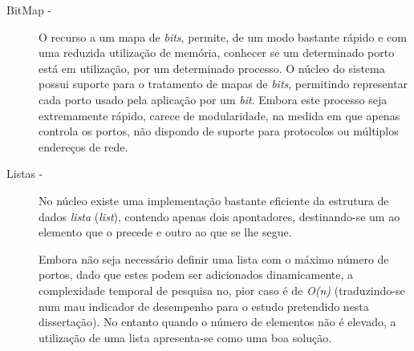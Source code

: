 \begin{description}

\item[BitMap - ]

O recurso a um mapa de \textit{bits}, permite, de um modo bastante rápido e com uma reduzida utilização de memória, conhecer se um determinado porto está em utilização, por um determinado processo.
O núcleo do sistema possui suporte para o tratamento de mapas de \textit{bits}, permitindo representar cada porto usado pela aplicação por um \textit{bit}.
Embora este processo seja extremamente rápido, carece de modularidade, na medida em que apenas controla os portos, não dispondo de suporte para protocolos ou múltiplos endereços de rede.

 



\item[Listas - ]

No núcleo existe uma implementação bastante eficiente da estrutura de dados \emph{lista} (\emph{list}), contendo apenas dois apontadores, destinando-se um ao elemento que o precede e outro ao que se lhe segue.

Embora não seja necessário definir uma lista com o máximo número de portos, dado que estes podem ser adicionados dinamicamente, a complexidade temporal de pesquisa no, pior caso é de \textit{O(n)} (traduzindo-se num mau indicador de desempenho para o estudo pretendido nesta dissertação).
No entanto quando o número de elementos não é elevado, a utilização de uma lista apresenta-se como uma boa solução.



\end{description}
